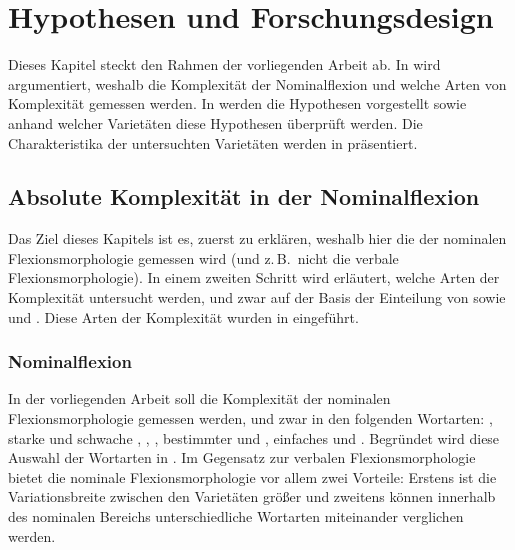 \chapter{Hypothesen und Forschungsdesign}\label{3}

Dieses Kapitel steckt den Rahmen der vorliegenden Arbeit ab. In  wird argumentiert, weshalb die Komplexität der Nominalflexion und welche Arten von Komplexität gemessen werden. In  werden die Hypothesen vorgestellt sowie anhand welcher Varietäten diese Hypothesen überprüft werden. Die Charakteristika der untersuchten Varietäten werden in  präsentiert.

\section{Absolute Komplexität in der Nominalflexion}\label{3.1}

Das Ziel dieses Kapitels ist es, zuerst zu erklären, weshalb hier die  der nominalen Flexionsmorphologie gemessen wird (und z.\,B.\ nicht die verbale Flexionsmorphologie). In einem zweiten Schritt wird erläutert, welche Arten der Komplexität untersucht werden, und zwar auf der Basis der Einteilung von \citet{Miestamo2008} sowie \citet{Rescher1998} und \citet{Sinnemäki2011}. Diese Arten der Komplexität wurden in  eingeführt.

\subsection{Nominalflexion}\label{3.1.1}

In der vorliegenden Arbeit soll die Komplexität der nominalen Flexionsmorphologie gemessen werden, und zwar in den folgenden Wortarten: , starke und schwache , , , bestimmter und , einfaches  und . Begründet wird diese Auswahl der Wortarten in . Im Gegensatz zur verbalen Flexionsmorphologie bietet die nominale Flexionsmorphologie vor allem zwei Vorteile: Erstens ist die Variationsbreite zwischen den Varietäten größer und zweitens können innerhalb des nominalen Bereichs unterschiedliche Wortarten miteinander verglichen werden.\largerpage[1.5]

